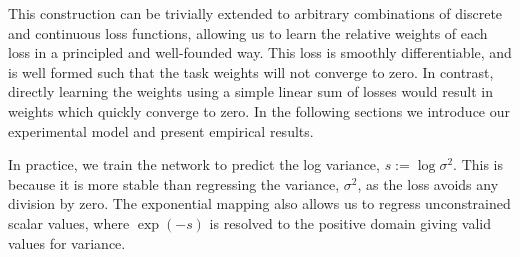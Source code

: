 
This construction can be trivially extended to arbitrary combinations of discrete and continuous loss functions, allowing us to learn the relative weights of each loss in a principled and well-founded way. This loss is smoothly differentiable, and is well formed such that the task weights will not converge to zero. In contrast, directly learning the weights using a simple linear sum of losses  would result in weights which quickly converge to zero. In the following sections we introduce our experimental model and present empirical results.

In practice, we train the network to predict the log variance, $s := \log \sigma^2$.
This is because it is more stable than regressing the variance, $\sigma^2$, as the loss avoids any division by zero. The exponential mapping also allows us to regress unconstrained scalar
values, where $\exp(-s)$ is resolved to the positive domain giving valid values for variance.



